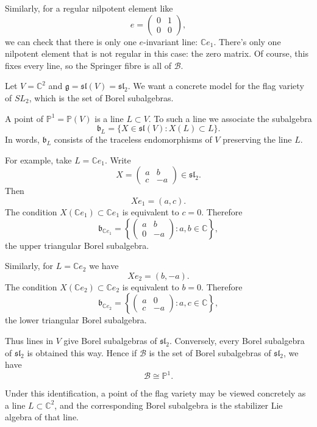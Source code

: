 Similarly, for a regular nilpotent element
like
$$
e = \begin{pmatrix}0&1\\ 0&0\end{pmatrix},
$$
we can check that there is only
one $e$-invariant line: $\mathbb{C}e_1$.
There's only one nilpotent element that
is not regular in this case: the zero matrix.
Of course, this fixes every line, so
the Springer fibre is all of $\mathcal{B}$.

\medskip\noindent
Let $V=\mathbb C^2$ and
$\mathfrak g=\mathfrak{sl}(V)=\mathfrak{sl}_2$.
We want a concrete model for the flag variety
of $SL_2$, which is the set
of Borel subalgebras.

A point of $\mathbb P^1=\mathbb P(V)$ is a
line $L\subset V$. To such a line we associate
the subalgebra
$$
\mathfrak b_L
=
\{X\in\mathfrak{sl}(V):X(L)\subset L\}.
$$
In words, $\mathfrak b_L$ consists of the
traceless endomorphisms of $V$ preserving the
line $L$.

For example, take $L=\mathbb C e_1$. Write
$$
X=
\begin{pmatrix}
a&b\\
c&-a
\end{pmatrix}
\in\mathfrak{sl}_2.
$$
Then
$$
Xe_1=(a,c).
$$
The condition $X(\mathbb C e_1)\subset
\mathbb C e_1$ is equivalent to $c=0$.
Therefore
$$
\mathfrak b_{\mathbb C e_1}
=
\left\{
\begin{pmatrix}
a&b\\
0&-a
\end{pmatrix}
:a,b\in\mathbb C
\right\},
$$
the upper triangular Borel subalgebra.

Similarly, for $L=\mathbb C e_2$ we have
$$
Xe_2=(b,-a).
$$
The condition $X(\mathbb C e_2)\subset
\mathbb C e_2$ is equivalent to $b=0$.
Therefore
$$
\mathfrak b_{\mathbb C e_2}
=
\left\{
\begin{pmatrix}
a&0\\
c&-a
\end{pmatrix}
:a,c\in\mathbb C
\right\},
$$
the lower triangular Borel subalgebra.

Thus lines in $V$ give Borel subalgebras of
$\mathfrak{sl}_2$. Conversely, every Borel
subalgebra of $\mathfrak{sl}_2$ is obtained
this way. Hence 
if $\mathcal{B}$ is the set
of Borel subalgebras of $\mathfrak{sl}_2$,
we have
$$
\mathcal B
\cong
\mathbb P^1.
$$

Under this identification, a point of the flag
variety may be viewed concretely as a line
$L\subset\mathbb C^2$, and the corresponding
Borel subalgebra is the stabilizer Lie algebra
of that line.

